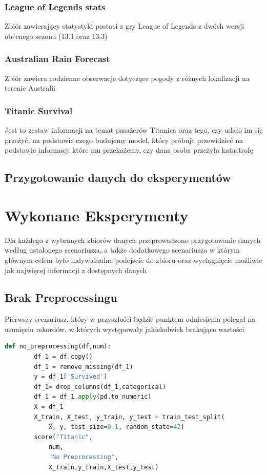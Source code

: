 \documentclass{book}
\begin{document}
\subsection{League of Legends stats}
Zbiór zawierający statystyki postaci z gry League of Legends z 
dwóch wersji obecnego sezonu (13.1 oraz 13.3)
\subsection{Australian Rain Forecast}
Zbiór zawiera codzienne obserwacje dotyczące pogody z różnych 
lokalizacji na terenie Australii
\subsection{Titanic Survival}
Jest to zestaw informacji na temat pasażerów Titanica oraz tego, 
czy udało im się przeżyć, na podstawie czego budujemy model, 
który próbuje przewidzieć na podstawie informacji które mu przekażemy, 
czy dana osoba przeżyła katastrofę

\section{Przygotowanie danych do eksperymentów}

\chapter{Wykonane Eksperymenty}
Dla każdego z wybranych zbiorów danych przeprowadzono 
przygotowanie danych według ustalonego scenariusza, 
a także dodatkowego scenariusza w którym głównym celem było 
indywidualne podejście do zbioru oraz wyciągnięcie możliwie 
jak najwięcej informacji z dostępnych danych
\section{Brak Preprocessingu}
Pierwszy scenariusz, który w przyszłości 
będzie punktem odniesienia polegał na usunięciu rekordów, 
w których występowały jakiekolwiek brakujące wartości

\begin{lstlisting}[language=Python, caption={Brak przygotowania
     danych dla zbioru danych Titanic}, captionpos=b]
    def no_preprocessing(df,num):
        df_1 = df.copy()
        df_1 = remove_missing(df_1)
        y = df_1['Survived']
        df_1= drop_columns(df_1,categorical)
        df_1 = df_1.apply(pd.to_numeric)
        X = df_1
        X_train, X_test, y_train, y_test = train_test_split(
            X, y, test_size=0.1, random_state=42)
        score("Titanic",
            num,
            "No Preprocessing",
            X_train,y_train,X_test,y_test)
    \end{lstlisting}
\end{document}
